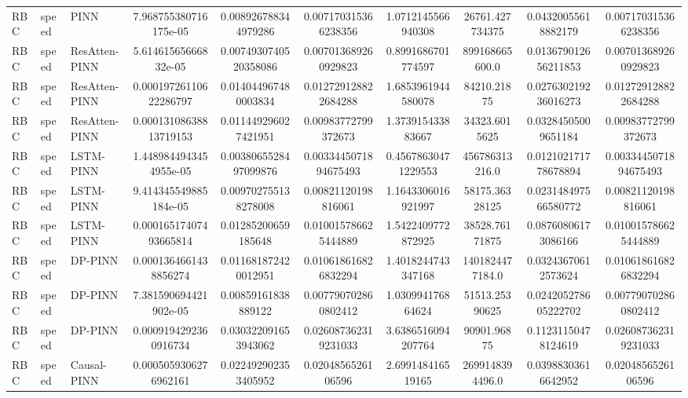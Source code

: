 \begin{landscape}
\begin{longtable}{lllccccccc}
 RBC & speed &           PINN &  7.968755380716175e-05 &   0.008926788344979286 &   0.007170315366238356 &   1.0712145566940308 &       26761.427734375 &   0.04320055618882179 &   0.007170315366238356 \\
 RBC & speed &  ResAtten-PINN &   5.61461565666832e-05 &  0.0074930740520358086 &   0.007013689260929823 &   0.8991686701774597 &        899168665600.0 &  0.013679012656211853 &   0.007013689260929823 \\
 RBC & speed &  ResAtten-PINN & 0.00019726110622286797 &   0.014044967480003834 &   0.012729128822684288 &   1.6853961944580078 &           84210.21875 &  0.027630219236016273 &   0.012729128822684288 \\
 RBC & speed &  ResAtten-PINN & 0.00013108638813719153 &   0.011449296027421951 &    0.00983772799372673 &    1.373915433883667 &         34323.6015625 &   0.03284505009651184 &    0.00983772799372673 \\
 RBC & speed &      LSTM-PINN & 1.4489844943454955e-05 &  0.0038065528497099876 &  0.0033445071894675493 &  0.45678630471229553 &        456786313216.0 &  0.012102171778678894 &  0.0033445071894675493 \\
 RBC & speed &      LSTM-PINN &  9.414345549885184e-05 &   0.009702755138278008 &    0.00821120198816061 &   1.1643306016921997 &        58175.36328125 &  0.023148497566580772 &    0.00821120198816061 \\
 RBC & speed &      LSTM-PINN & 0.00016517407493665814 &    0.01285200659185648 &   0.010015786625444889 &   1.5422409772872925 &        38528.76171875 &   0.08760806173086166 &   0.010015786625444889 \\
 RBC & speed &        DP-PINN &  0.0001364661438856274 &   0.011681872420012951 &   0.010618616826832294 &   1.4018244743347168 &       1401824477184.0 &   0.03243670612573624 &   0.010618616826832294 \\
 RBC & speed &        DP-PINN &  7.381590694421902e-05 &    0.00859161838889122 &   0.007790702860802412 &    1.030994176864624 &        51513.25390625 &  0.024205278605222702 &   0.007790702860802412 \\
 RBC & speed &        DP-PINN &  0.0009194292360916734 &   0.030322091653943062 &   0.026087362319231033 &   3.6386516094207764 &           90901.96875 &   0.11231150478124619 &   0.026087362319231033 \\
 RBC & speed &    Causal-PINN &  0.0005059306276962161 &   0.022492902353405952 &     0.0204856526106596 &    2.699148416519165 &       2699148394496.0 &   0.03988303616642952 &     0.0204856526106596 \\

\end{longtable}
\end{landscape}
